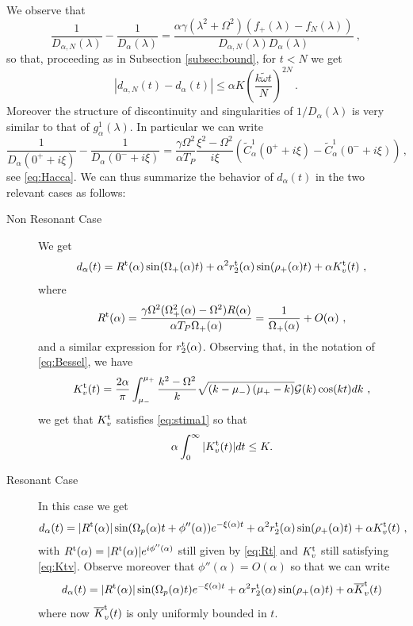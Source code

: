 \documentclass[11pt]{article}
\numberwithin{equation}{section}
\numberwithin{theorem}{section}
\def\tilde#1{\widetilde{#1}}
\begin{document}
We observe that
\[
\frac{1}{D_{\alpha,N}(\lambda)}-\frac{1}{D_{\alpha}(\lambda)}=
\frac{\alpha\gamma(\lambda^2+\Omega^2)(f_+(\lambda)-f_N(\lambda))}{D_{\alpha,N}(\lambda)D_{\alpha}(\lambda)}\ ,
\]
so that, proceeding as in Subsection \ref{subsec:bound}, for $t<N$ we get
\[
 |d_{\alpha,N}(t) - d_\alpha(t)|\leq \alpha K\left(\frac{k\tilde\omega t}N\right)^{2N}\, .
\]
Moreover the structure of discontinuity and singularities of $1/D_\alpha(\lambda)$ is very similar to that of 
$g^1_\alpha(\lambda)$. In particular we can write
\[
\frac 1{D_\alpha(0^++i\xi)}-\frac 1{D_\alpha(0^-+i\xi)}= 
\frac{\gamma\Omega^2}{\alpha T_P}\frac {\xi^2-\Omega^2}{i\xi} \left(\tilde C^1_\alpha(0^++i\xi)-\tilde 
C^1_\alpha(0^-+i\xi)\right)\, ,
\]
see \eqref{eq:Hacca}. We can thus summarize the behavior of $d_\alpha(t)$ in the two relevant cases as follows:

\begin{description}
\item[Non Resonant Case] We get
\begin{equation}\label{eq:dalphanr}
d_\alpha(t)=R^{\rm t}(\alpha)\sin(\Omega_+(\alpha)t)+\alpha^2r_2^{\rm t}(\alpha)\sin(\rho_+(\alpha)t)+\alpha K^{\rm
	t}_{v}(t)\ ,
\end{equation}
where
\begin{equation}\label{eq:Rt}
R^{\rm t}(\alpha)=\frac{\gamma\Omega^2
  (\Omega^2_+(\alpha)-\Omega^2)R(\alpha)}{\alpha T_P\Omega_+(\alpha)}
= \frac 1{\Omega_+(\alpha)}+O(\alpha)\ ,
\end{equation}
and a similar expression for $r^{\rm t}_2(\alpha)$. Observing that, in the notation of \eqref{eq:Bessel}, we have
\begin{equation}\label{eq:Kr}
K^{\rm t}_{v}(t)=\frac{2\alpha}{\pi}\int_{\mu_-}^{\mu_+}\frac{k^2-\Omega^2}k
\sqrt{(k-\mu_-)\left(\mu_+-k\right)}\mathcal G(k)\cos(kt)dk\ ,
\end{equation}
we get that $K^{\rm t}_{v}$ satisfies \eqref{eq:stima1} so that
\begin{equation}\label{eq:Ktv}
\alpha\int_0^\infty |K^{\rm t}_{v}(t)|dt\leq K.
\end{equation}
	
\item[Resonant Case] In this case we get
\begin{equation*}
d_\alpha(t)=|R^{\rm t}(\alpha)|\sin(\Omega_p(\alpha)t+\phi''(\alpha))e^{-\xi(\alpha)t}+\alpha^2r^{\rm
t}_2(\alpha)\sin(\rho_+(\alpha)t)+\alpha K^{\rm t}_{v}(t)\ ,
\end{equation*}
with $R^{\rm t}(\alpha)=|R^{\rm t}(\alpha)|e^{i\phi''(\alpha)}$ still given by \eqref{eq:Rt} and $K^{\rm t}_{v}$ still
satisfying \eqref{eq:Ktv}. Observe moreover that $\phi''(\alpha)=O(\alpha)$ so that we can write
\begin{equation}\label{eq:dalphar}
d_\alpha(t)=|R^{\rm t}(\alpha)|\sin(\Omega_p(\alpha)t)e^{-\xi(\alpha)t}+\alpha^2r^{\rm
t}_2(\alpha)\sin(\rho_+(\alpha)t)+\alpha \overline K^{\rm t}_{v}(t)
\end{equation}
where now $\overline K^{\rm t}_{v}(t)$ is only uniformly bounded in $t$.
	
\end{description}
	
\end{document}
